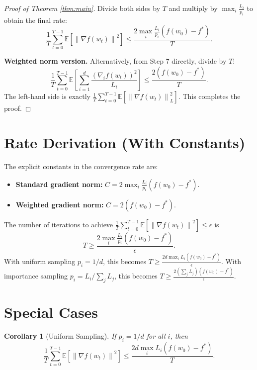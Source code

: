 \documentclass{article}
\newtheorem{corollary}{Corollary}
\newcommand{\E}{\mathbb{E}}
\newcommand{\norm}[1]{\left\|#1\right\|}
\newcommand{\step}[1]{\text{[Step #1]}}
\begin{document}
\begin{proof}[Proof of Theorem \ref{thm:main}]
\step{12} Divide both sides by $T$ and multiply by $\max_i \frac{L_i}{p_i}$ to obtain the final rate:
\begin{equation}
\frac{1}{T} \sum_{t=0}^{T-1} \E\left[ \norm{\nabla f(w_t)}^2 \right]
\le \frac{2 \max_i \frac{L_i}{p_i} \left( f(w_0) - f^* \right)}{T}.
\end{equation}

\step{13} \textbf{Weighted norm version.}
Alternatively, from Step 7 directly, divide by $T$:
\begin{equation}
\frac{1}{T} \sum_{t=0}^{T-1} \E\left[ \sum_{i=1}^d \frac{(\nabla_i f(w_t))^2}{L_i} \right]
\le \frac{2 \left( f(w_0) - f^* \right)}{T}.
\end{equation}
The left-hand side is exactly $\frac{1}{T}\sum_{t=0}^{T-1} \E[\norm{\nabla f(w_t)}_L^2]$. This completes the proof.
\end{proof}

\section*{Rate Derivation (With Constants)}

The explicit constants in the convergence rate are:
\begin{itemize}
    \item \textbf{Standard gradient norm:} $C = 2 \max_i \frac{L_i}{p_i} (f(w_0)-f^*)$.
    \item \textbf{Weighted gradient norm:} $C = 2 (f(w_0)-f^*)$.
\end{itemize}
The number of iterations to achieve $\frac{1}{T}\sum_{t=0}^{T-1} \E[\norm{\nabla f(w_t)}^2] \le \epsilon$ is
\begin{equation}
T \ge \frac{2 \max_i \frac{L_i}{p_i} (f(w_0)-f^*)}{\epsilon}.
\end{equation}
With uniform sampling $p_i = 1/d$, this becomes $T \ge \frac{2 d \max_i L_i (f(w_0)-f^*)}{\epsilon}$.
With importance sampling $p_i = L_i / \sum_j L_j$, this becomes $T \ge \frac{2 (\sum_j L_j) (f(w_0)-f^*)}{\epsilon}$.

\section*{Special Cases}

\begin{corollary}[Uniform Sampling]
If $p_i = 1/d$ for all $i$, then
\begin{equation}
\frac{1}{T} \sum_{t=0}^{T-1} \E\left[ \norm{\nabla f(w_t)}^2 \right]
\le \frac{2 d \max_i L_i (f(w_0)-f^*)}{T}.
\end{equation}
\end{corollary}
\end{document}
